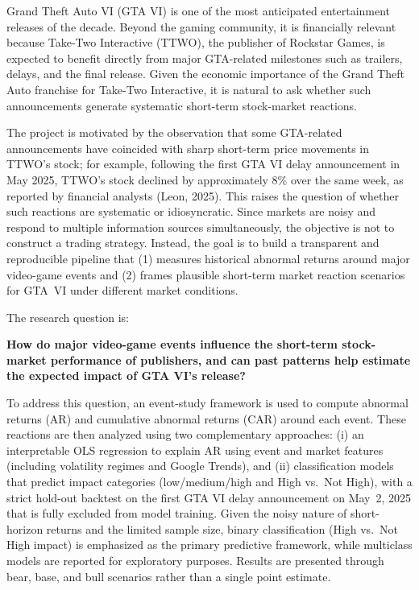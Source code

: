 \documentclass[11pt,a4paper]{article}
\begin{document}
Grand Theft Auto VI (GTA VI) is one of the most anticipated entertainment releases of the decade. Beyond the gaming community, it is financially relevant because Take-Two Interactive (TTWO), the publisher of Rockstar Games, is expected to benefit directly from major GTA-related milestones such as trailers, delays, and the final release. Given the economic importance of the Grand Theft Auto franchise for Take-Two Interactive, it is natural to ask whether such announcements generate systematic short-term stock-market reactions.

The project is motivated by the observation that some GTA-related announcements have coincided with sharp short-term price movements in TTWO’s stock; for example, following the first GTA VI delay announcement in May 2025, TTWO’s stock declined by approximately 8\% over the same week, as reported by financial analysts  (Leon, 2025). This raises the question of whether such reactions are systematic or idiosyncratic. Since markets are noisy and respond to multiple information sources simultaneously, the objective is not to construct a trading strategy. Instead, the goal is to build a transparent and reproducible pipeline that (1) measures historical abnormal returns around major video-game events and (2) frames plausible short-term market reaction scenarios for GTA~VI under different market conditions.

The research question is:

\textbf{How do major video-game events influence the short-term stock-market performance of publishers, and can past patterns help estimate the expected impact of GTA VI’s release?}

To address this question, an event-study framework is used to compute abnormal returns (AR) and cumulative abnormal returns (CAR) around each event. These reactions are then analyzed using two complementary approaches: (i) an interpretable OLS regression to explain AR using event and market features (including volatility regimes and Google Trends), and (ii) classification models that predict impact categories (low/medium/high and High vs.\ Not High), with a strict hold-out backtest on the first GTA VI delay announcement on May~2, 2025 that is fully excluded from model training.  Given the noisy nature of short-horizon returns and the limited sample size, binary classification (High vs.\ Not High impact) is emphasized as the primary predictive framework, while multiclass models are reported for exploratory purposes. Results are presented through bear, base, and bull scenarios rather than a single point estimate.
\end{document}
